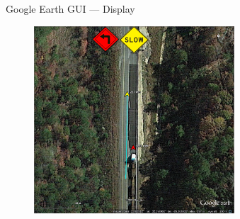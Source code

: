 \documentclass{beamer}
\begin{document}
    \begin{frame}{Google Earth GUI --- Display}
      \begin{figure}
        \includegraphics[width=7.5cm]{../graphics/earth_display.png}
      \end{figure}
    \end{frame}
\end{document}
